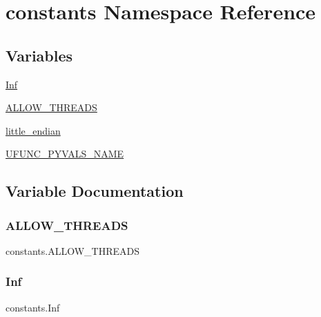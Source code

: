 \hypertarget{namespaceconstants}{}\section{constants Namespace Reference}
\label{namespaceconstants}
\subsection*{Variables}
\begin{DoxyCompactItemize}
\item 
\hyperlink{namespaceconstants_a64d3f8625c31d91a5a3e278ea73425b2}{Inf}
\item 
\hyperlink{namespaceconstants_ad8a339467b72308e031f6525360b4a26}{A\+L\+L\+O\+W\+\_\+\+T\+H\+R\+E\+A\+DS}
\item 
\hyperlink{namespaceconstants_ae6175a23c58175d42104ce25590c29b0}{little\+\_\+endian}
\item 
\hyperlink{namespaceconstants_a209e42249e6d08b529686854e20c0799}{U\+F\+U\+N\+C\+\_\+\+P\+Y\+V\+A\+L\+S\+\_\+\+N\+A\+ME}
\end{DoxyCompactItemize}


\subsection{Variable Documentation}
\mbox{\label{namespaceconstants_ad8a339467b72308e031f6525360b4a26}} 
\subsubsection{\texorpdfstring{A\+L\+L\+O\+W\+\_\+\+T\+H\+R\+E\+A\+DS}{ALLOW\_THREADS}}
{\footnotesize\ttfamily constants.\+A\+L\+L\+O\+W\+\_\+\+T\+H\+R\+E\+A\+DS}

\mbox{\label{namespaceconstants_a64d3f8625c31d91a5a3e278ea73425b2}} 
\subsubsection{\texorpdfstring{Inf}{Inf}}
{\footnotesize\ttfamily constants.\+Inf}

